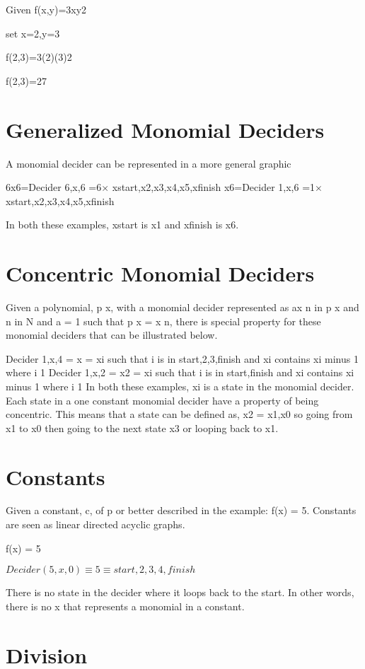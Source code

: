 Given f(x,y)=3xy2

set x=2,y=3

f(2,3)=3(2)(3)2

f(2,3)=27

\section{Generalized Monomial Deciders}

A monomial decider can be represented in a more general graphic

6x6=Decider 6,x,6 =6$\times $ xstart,x2,x3,x4,x5,xfinish 
 x6=Decider 1,x,6 =1$\times $ xstart,x2,x3,x4,x5,xfinish 


In both these examples, xstart is x1 and xfinish is x6.


\section{Concentric Monomial Deciders}

Given a polynomial, p x, with a monomial decider represented as ax n in p x and n in N and a = 1 such that p x = x n, there is special property for these monomial deciders that can be illustrated below.

Decider 1,x,4 = x = xi such that i is in start,2,3,finish and xi contains xi minus 1 where i 1
 Decider 1,x,2 = x2 = xi such that i is in start,finish and xi contains xi minus 1 where i 1
 In both these examples, xi is a state in the monomial decider.
Each state in a one constant monomial decider have a property of being concentric. This means that a state can be defined as, x2 =
 x1,x0 so going from x1 to x0 then going to the next state x3 or looping back to x1.
 
\section{Constants}

Given a constant, c, of p or better described in the example: f(x) = 5. Constants are seen as linear directed acyclic graphs.

f(x) = 5

$Decider(5,x,0) \equiv 5 \equiv {start,2,3,4,finish}$

There is no state in the decider where it loops back to the start. In other words, there is no x that represents a monomial in a constant.

\section{Division}

